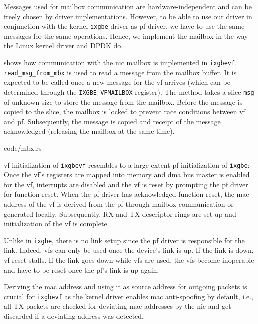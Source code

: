 Messages used for mailbox communication are hardware-independent and can be
freely chosen by driver implementations. However, to be able to use our driver
in conjunction with the kernel \texttt{ixgbe} driver as \ac{pf} driver, we have
to use the same messages for the same operations. Hence, we implement the
mailbox in the way the Linux kernel driver and DPDK do.

 shows how communication with the \ac{nic} mailbox is implemented
in \texttt{ixgbevf}. \linebreak \texttt{read\_msg\_from\_mbx} is used to read a
message from the mailbox buffer. It is expected to be called once a new message
for the \ac{vf} arrives (which can be determined through the
\texttt{IXGBE\_VFMAILBOX} register). The method takes a slice \texttt{msg} of
unknown size to store the message from the mailbox. Before the message is copied
to the slice, the mailbox is locked to prevent race conditions between \ac{vf}
and \ac{pf}. Subsequently, the message is copied and receipt of the message
acknowledged (releasing the mailbox at the same time).

\begin{minipage}{\textwidth}
     {code/mbx.rs}
\end{minipage}

\ac{vf} initialization of \texttt{ixgbevf} resembles to a large extent \ac{pf}
initialization of \texttt{ixgbe}: Once the \ac{vf}'s registers are mapped into
memory and \ac{dma} bus master is enabled for the \ac{vf}, interrupts are
disabled and the \ac{vf} is reset by prompting the \ac{pf} driver for function
reset. When the \ac{pf} driver has acknowledged function reset, the \ac{mac}
address of the \ac{vf} is derived from the \ac{pf} through mailbox communication
or generated locally. Subsequently, RX and TX descriptor rings are set up and
initialization of the \ac{vf} is complete.

Unlike in \texttt{ixgbe}, there is no link setup since the \ac{pf} driver is
responsible for the link. Indeed, \acp{vf} can only be used once the device's
link is up. If the link is down, \ac{vf} reset stalls. If the link goes down
while \acp{vf} are used, the \acp{vf} become inoperable and have to be reset
once the \ac{pf}'s link is up again.

Deriving the \ac{mac} address and using it as source address for outgoing
packets is crucial for \texttt{ixgbevf} as the kernel driver enables \ac{mac}
anti-spoofing by default, i.e., all TX packets are checked for deviating
\ac{mac} addresses by the \ac{nic} and get discarded if a deviating address was
detected.



